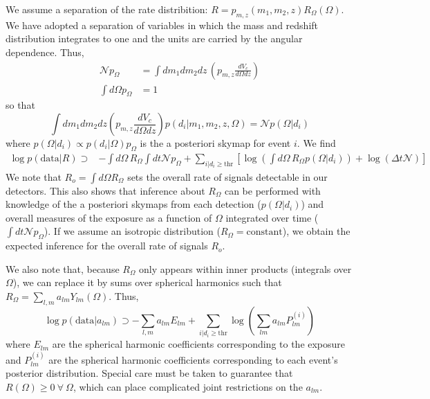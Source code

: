 \documentclass{article}
\begin{document}
We assume a separation of the rate distribition: $R = p_{m,z}(m_1, m_2, z) R_\Omega(\Omega)$.
We have adopted a separation of variables in which the mass and redshift distribution integrates to one and the units are carried by the angular dependence.
Thus,
\begin{align}
    \mathcal{N} p_\Omega & = \int dm_1 dm_2 dz\, \left(p_{m,z} \frac{dV_c}{d\Omega dz} \right) \\
    \int d\Omega p_\Omega & = 1
\end{align}
so that
\begin{equation}
    \int dm_1 dm_2 dz \left( p_{m,z}\frac{dV_c}{d\Omega dz} \right) p(d_i|m_1, m_2, z, \Omega) = \mathcal{N} p(\Omega|d_i)
\end{equation}
where $p(\Omega|d_i)\propto p(d_i|\Omega)p_\Omega$ is the a posteriori skymap for event $i$.
We find
\begin{align}
    \log p(\mathrm{data}|R) \supset & - \int d\Omega\, R_\Omega \int dt \mathcal{N} p_\Omega + \sum\limits_{i|d_i\geq\mathrm{thr}} \left[ \log\left(\int d\Omega\, R_\Omega p(\Omega|d_i)\right) + \log\left(\Delta t \mathcal{N}\right) \right] 
\end{align}
We note that $R_o = \int d\Omega R_\Omega$ sets the overall rate of signals detectable in our detectors.
This also shows that inference about $R_\Omega$ can be performed with knowledge of the a posteriori skymaps from each detection ($p(\Omega|d_i)$) and overall measures of the exposure as a function of $\Omega$ integrated over time ($\int dt \mathcal{N} p_\Omega$).
If we assume an isotropic distribution ($R_\Omega = \text{constant}$), we obtain the expected inference for the overall rate of signals $R_o$.

We also note that, because $R_\Omega$ only appears within inner products (integrals over $\Omega$), we can replace it by sums over spherical harmonics such that $R_\Omega = \sum\limits_{l,m} a_{lm} Y_{lm}(\Omega)$.
Thus, 
\begin{equation}
    \log p(\mathrm{data}|a_{lm}) \supset - \sum\limits_{l,m} a_{lm} E_{lm} + \sum\limits_{i|d_i\geq\mathrm{thr}} \log\left(\sum\limits_{lm} a_{lm} P_{lm}^{(i)} \right)
\end{equation}
where $E_{lm}$ are the spherical harmonic coefficients corresponding to the exposure and $P_{lm}^{(i)}$ are the spherical harmonic coefficients corresponding to each event's posterior distribution.
Special care must be taken to guarantee that $R(\Omega)\geq0\ \forall\ \Omega$, which can place complicated joint restrictions on the $a_{lm}$.
\end{document}
